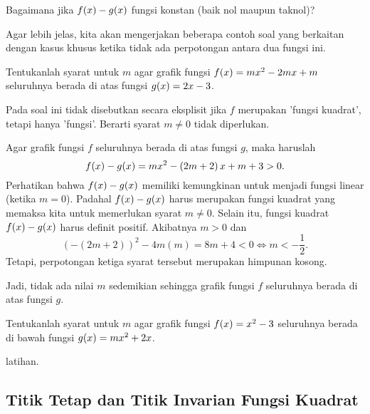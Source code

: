 		\begin{explbox}
			Bagaimana jika $ \mathop{}\!{f}{\left({x}\right)} - \mathop{}\!{g}{\left({x}\right)} $ fungsi konstan (baik nol maupun taknol)?
		\end{explbox}
		
		\par Agar lebih jelas, kita akan mengerjakan beberapa contoh soal yang berkaitan dengan kasus khusus ketika tidak ada perpotongan antara dua fungsi ini.
		
		\begin{contoh}
			Tentukanlah syarat untuk $ m $ agar grafik fungsi $ \mathop{}\!{f}{\left({x}\right)} = mx^{2} - 2mx + m $ seluruhnya berada di atas fungsi $ \mathop{}\!{g}{\left({x}\right)} = 2x - 3 $.
		\end{contoh}
		\begin{jawab}
			Pada soal ini tidak disebutkan secara eksplisit jika $ f $ merupakan 'fungsi kuadrat', tetapi hanya 'fungsi'. Berarti syarat $ m \ne 0 $ tidak diperlukan.
			\par Agar grafik fungsi $ f $ seluruhnya berada di atas fungsi $ g $, maka haruslah
			\[ \mathop{}\!{f}{\left({x}\right)} - \mathop{}\!{g}{\left({x}\right)} = mx^{2} - \left(2m + 2\right)x + m + 3 > 0. \]
			Perhatikan bahwa $ \mathop{}\!{f}{\left({x}\right)} - \mathop{}\!{g}{\left({x}\right)} $ memiliki kemungkinan untuk menjadi fungsi linear (ketika $ m = 0 $). Padahal $ \mathop{}\!{f}{\left({x}\right)} - \mathop{}\!{g}{\left({x}\right)} $ harus merupakan fungsi kuadrat yang memaksa kita untuk memerlukan syarat $ m \ne 0 $. Selain itu, fungsi kuadrat $ \mathop{}\!{f}{\left({x}\right)} - \mathop{}\!{g}{\left({x}\right)} $ harus definit positif. Akibatnya $ m > 0 $ dan
			\[ \left(-\left(2m + 2\right)\right)^{2} - 4m\left(m\right) = 8m + 4 < 0 \iff m < -\frac{1}{2}. \]
			Tetapi, perpotongan ketiga syarat tersebut merupakan himpunan kosong.
			\par Jadi, tidak ada nilai $ m $ sedemikian sehingga grafik fungsi $ f $ seluruhnya berada di atas fungsi $ g $.
		\end{jawab}
		
		\begin{contoh}
			Tentukanlah syarat untuk $ m $ agar grafik fungsi $ \mathop{}\!{f}{\left({x}\right)} = x^{2} - 3 $ seluruhnya berada di bawah fungsi $ \mathop{}\!{g}{\left({x}\right)} = mx^{2} + 2x $.
		\end{contoh}
		\begin{jawab}
			latihan.
		\end{jawab}
	
\subsection{Titik Tetap dan Titik Invarian Fungsi Kuadrat}
	
